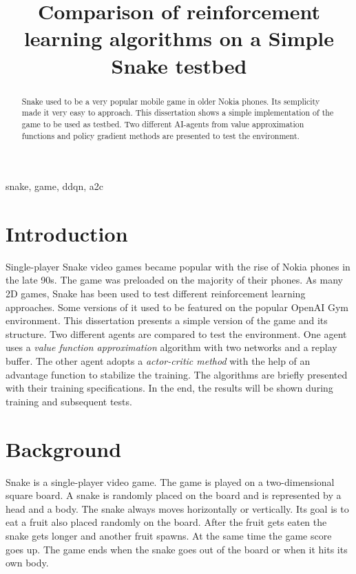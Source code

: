 \documentclass[conference]{IEEEtran}
\begin{document}
\title{Comparison of reinforcement learning algorithms on a Simple Snake testbed}

\author{
}

\maketitle

\begin{abstract}
Snake used to be a very popular mobile game in older Nokia phones. Its semplicity made it very easy to approach. This dissertation shows 
a simple implementation of the game to be used as testbed. Two different AI-agents from value approximation functions and policy gradient methods
are presented to test the environment.
\end{abstract}

\begin{IEEEkeywords}
snake, game, ddqn, a2c
\end{IEEEkeywords}

\section{Introduction}
Single-player Snake video games became popular with the rise of Nokia phones in the late 90s. 
The game was preloaded on the majority of their phones. As many 2D games, Snake has been used to test different reinforcement
learning approaches. Some versions of it used to be featured on the popular OpenAI Gym environment. 
This dissertation presents a simple version of the game and its structure. Two different agents are compared to test the environment.
One agent uses a \textit{value function approximation} algorithm with two networks and a replay buffer. The other agent adopts a \textit{actor-critic method} with 
the help of an advantage function to stabilize the training. The algorithms are briefly presented with their training specifications. In the end, 
the results will be shown during training and subsequent tests.

\section{Background}
Snake is a single-player video game. The game is played on a two-dimensional square board. A snake is randomly placed on the board and is represented 
by a head and a body. The snake always moves horizontally or vertically. Its goal is to eat a fruit also placed randomly on the board. After the fruit gets
eaten the snake gets longer and another fruit spawns. At the same time the game score goes up. The game ends when the snake goes out of the board or when it hits
its own body.
\end{document}
